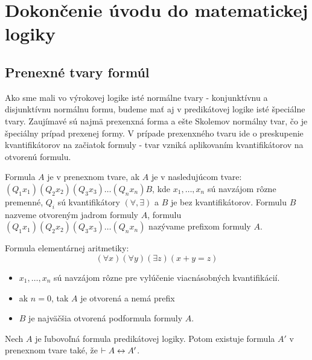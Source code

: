 \chapter{Dokončenie úvodu do matematickej logiky}

\section{Prenexné tvary formúl}

Ako sme mali vo výrokovej logike isté normálne tvary - konjunktívnu a
disjunktívnu normálnu formu, budeme mať aj v predikátovej logike isté
špeciálne tvary. Zaujímavé sú najmä prexenxná forma a ešte Skolemov
normálny tvar, čo je špeciálny prípad prexenej formy.
V prípade prexenxného tvaru ide o preskupenie kvantifikátorov na
začiatok formuly - tvar vzniká aplikovaním kvantifikátorov na otvorenú
formulu.


\begin{definicia}
    Formula $A$ je v prenexnom tvare, ak $A$ je v nasledujúcom tvare:
     $(Q_1 x_1) (Q_2 x_2) (Q_3 x_3) \dots (Q_n x_n) B$, kde
     $x_1, \dots , x_n$ sú navzájom rôzne premenné, $Q_i$ sú
     kvantifikátory $(\forall, \exists)$ a 
     $B$ je bez kvantifikátorov.
    Formulu $B$ nazveme otvoreným jadrom formuly $A$, 
    formulu $(Q_1 x_1) (Q_2 x_2) (Q_3 x_3) \dots (Q_n x_n)$ nazývame
    prefixom formuly $A$.
\end{definicia}

\begin{priklad}
    Formula elementárnej aritmetiky:
    \begin{equation*}
        (\forall x) (\forall y) (\exists z) (x+y=z)
    \end{equation*}
\end{priklad}

\begin{poznamka}
\begin{itemize}
 \item $x_1, \dots, x_n$ sú navzájom rôzne pre vylúčenie viacnásobných
    kvantifikácií.
 \item ak $n=0$, tak $A$ je otvorená a nemá prefix
 \item $B$ je najväčšia otvorená podformula formuly $A$.
\end{itemize}
\end{poznamka}


\begin{veta}
 Nech $A$ je ľubovoľná formula predikátovej logiky. Potom existuje
 formula $A'$ v prenexnom tvare také, že
 $\vdash A \leftrightarrow A'$.
 \label{veta:prenex}
\end{veta}


